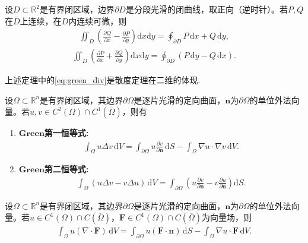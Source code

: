 \documentclass[../../main.tex]{subfiles}%
\begin{document}
\begin{theorem}\label{theorem:Green公式平面散度定理与旋度定理}
设$D\subset\mathbb{R}^2$是有界闭区域，边界$\partial D$是分段光滑的闭曲线，取正向（逆时针）。若$P,Q$在$\overline{D}$上连续，在$D$内连续可微，则
\begin{align*}
\iint_{D}\left(\frac{\partial Q}{\partial x}-\frac{\partial P}{\partial y}\right)\mathrm{d}x\mathrm{d}y=\oint_{\partial D}P\,\mathrm{d}x+Q\,\mathrm{d}y, 
\end{align*}
\begin{align}
\iint_{D}\left(\frac{\partial P}{\partial x}+\frac{\partial Q}{\partial y}\right)\mathrm{d}x\mathrm{d}y=\oint_{\partial D}(P\,\mathrm{d}y-Q\,\mathrm{d}x).\label{eq:green_div} 
\end{align}
\end{theorem}
\begin{remark}
上述定理中的\eqref{eq:green_div}是散度定理在二维的体现.
\end{remark}

\begin{theorem}[Green恒等式]\label{theorem:Green恒等式}
设$\Omega\subset\mathbb{R}^n$是有界闭区域，其边界$\partial\Omega$是逐片光滑的定向曲面，$\bm{n}$为$\partial\Omega$的单位外法向量。若$u,v\in C^2(\Omega)\cap C^1(\overline{\Omega})$，则有
\begin{enumerate}[(1)]
\item\label{theorem:Green第一恒等式} $\mathbf{Green}$\textbf{第一恒等式:}
\begin{align*}
\int_{\Omega}u\Delta v\,\mathrm{d}V=\int_{\partial\Omega}u\frac{\partial v}{\partial\bm{n}}\,\mathrm{d}S-\int_{\Omega}\nabla u\cdot\nabla v\,\mathrm{d}V.
\end{align*}

\item\label{theorem:Green第二恒等式} $\mathbf{Green}$\textbf{第二恒等式:}
\begin{align*}
\int_{\Omega}(u\Delta v-v\Delta u)\,\mathrm{d}V=\int_{\partial\Omega}\left(u\frac{\partial v}{\partial\bm{n}}-v\frac{\partial u}{\partial\bm{n}}\right)\mathrm{d}S. 
\end{align*}
\end{enumerate}
\end{theorem}

\begin{theorem}[多元函数分部积分公式]\label{theorem:多元函数分部积分公式}
设$\Omega\subset\mathbb{R}^n$是有界闭区域，其边界$\partial\Omega$是逐片光滑的定向曲面，$\bm{n}$为$\partial\Omega$的单位外法向量。若$u\in C^1(\Omega)\cap C(\overline{\Omega})$，$\bm{F}\in C^1(\Omega)\cap C(\overline{\Omega})$为向量场，则
\begin{align*}
\int_{\Omega}u(\nabla\cdot\bm{F})\,\mathrm{d}V=\int_{\partial\Omega}u(\bm{F}\cdot\bm{n})\,\mathrm{d}S-\int_{\Omega}\nabla u\cdot\bm{F}\,\mathrm{d}V. 
\end{align*}
\end{theorem}
\end{document}
